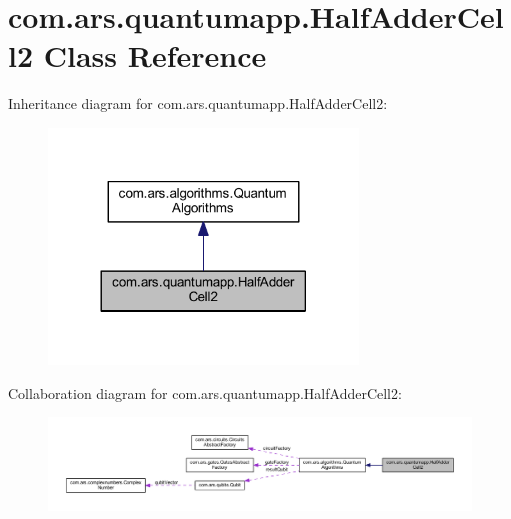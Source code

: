 \hypertarget{classcom_1_1ars_1_1quantumapp_1_1_half_adder_cell2}{}\section{com.\+ars.\+quantumapp.\+Half\+Adder\+Cell2 Class Reference}
\label{classcom_1_1ars_1_1quantumapp_1_1_half_adder_cell2}


Inheritance diagram for com.\+ars.\+quantumapp.\+Half\+Adder\+Cell2\+:
\nopagebreak
\begin{figure}[H]
\begin{center}
\leavevmode
\includegraphics[width=233pt]{classcom_1_1ars_1_1quantumapp_1_1_half_adder_cell2__inherit__graph}
\end{center}
\end{figure}


Collaboration diagram for com.\+ars.\+quantumapp.\+Half\+Adder\+Cell2\+:
\nopagebreak
\begin{figure}[H]
\begin{center}
\leavevmode
\includegraphics[width=350pt]{classcom_1_1ars_1_1quantumapp_1_1_half_adder_cell2__coll__graph}
\end{center}
\end{figure}
